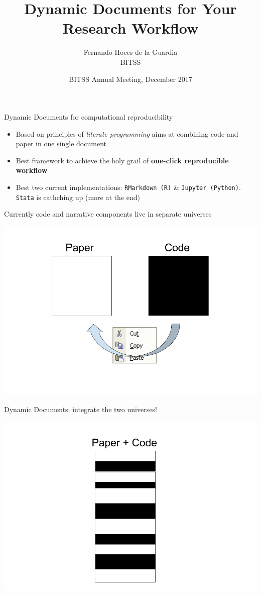 \documentclass[ignorenonframetext,]{beamer}
\title{Dynamic Documents for Your Research Workflow}
\author{Fernando Hoces de la Guardia\\
BITSS}
\date{BITSS Annual Meeting, December 2017}
\providecommand{\tightlist}{%
\setlength{\itemsep}{0pt}\setlength{\parskip}{0pt}}
\begin{document}
\frame{\titlepage}

\begin{frame}[fragile]{Dynamic Documents for computational
reproducibility}

\begin{itemize}
\tightlist
\item
  Based on principles of \emph{literate programming} aims at combining
  code and paper in one single document
\item
  Best framework to achieve the holy grail of \textbf{one-click
  reproducible workflow}
\item
  Best two current implementations: \texttt{RMarkdown\ (R)} \&
  \texttt{Jupyter\ (Python)}. \texttt{Stata} is cathching up (more at
  the end)
\end{itemize}

\end{frame}

\begin{frame}{Currently code and narrative components live in separate
universes}

\includegraphics{./Two universes.png}

\end{frame}

\begin{frame}{Dynamic Documents: integrate the two universes!}

\includegraphics{./One universe.png}

\end{frame}
\end{document}
